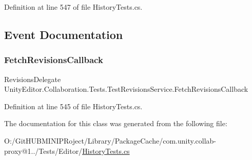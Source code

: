 Definition at line 547 of file History\+Tests.\+cs.



\subsection{Event Documentation}
\mbox{\label{class_unity_editor_1_1_collaboration_1_1_tests_1_1_test_revisions_service_a66ea2e2da006afb359655ae902e50b1d}} 
\subsubsection{\texorpdfstring{FetchRevisionsCallback}{FetchRevisionsCallback}}
{\footnotesize\ttfamily Revisions\+Delegate Unity\+Editor.\+Collaboration.\+Tests.\+Test\+Revisions\+Service.\+Fetch\+Revisions\+Callback}



Definition at line 545 of file History\+Tests.\+cs.



The documentation for this class was generated from the following file\+:\begin{DoxyCompactItemize}
\item 
O\+:/\+Git\+H\+U\+B\+M\+I\+N\+I\+P\+Roject/\+Library/\+Package\+Cache/com.\+unity.\+collab-\/proxy@1../\+Tests/\+Editor/\mbox{\hyperlink{_history_tests_8cs}{History\+Tests.\+cs}}\end{DoxyCompactItemize}

